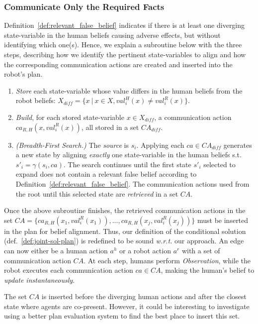 \subsubsection{Communicate Only the Required Facts}
Definition~\ref{def:relevant_false_belief} indicates if there is at least one diverging state-variable in the human beliefs causing adverse effects, but without identifying which one(s).
Hence, we explain a subroutine below with the three steps, describing how we identify the pertinent state-variables to align and how the corresponding communication actions are created and inserted into the robot's plan.

\begin{enumerate}
    \item 
    \textit{Store} each state-variable whose value differs in the human beliefs from the robot beliefs: $X_{diff} = \{ x ~|~ x\in X, val^H_i(x) \neq val^R_i(x) \}$.

    \item
    \textit{Build}, for each stored state-variable $x \in X_{diff}$, a communication action $ca_{R, H}(x,val^R_i(x))$, all stored in a set $\mathit{CA}_{diff}$.

    \item 
    \textit{(Breadth-First Search.)} 
    The \textit{source} is $s_i$. Applying each $ca \in \mathit{CA}_{diff}$ generates a new state by aligning \textit{exactly} one state-variable in the human beliefs s.t. $s'_i = \gamma(s_i, ca )$. 
    The search continues until the first state $s'_i$ selected to expand does not contain a relevant false belief according to Definition~\ref{def:relevant_false_belief}. The communication actions used from the root until this selected state are \textit{retrieved} in a set $\mathit{CA}$.
\end{enumerate}

Once the above subroutine finishes, the retrieved communication actions in the set $\mathit{CA} = \{ ca_{R, H}(x_1,val^R_i(x_1)),..., ca_{R, H}(x_j,val^R_i(x_j)) \}$ must be inserted in the plan for belief alignment. 
Thus, our definition of the conditional solution (def.~\ref{def:joint-sol-plan}) is redefined to be sound \textit{w.r.t.} our approach. An edge can now either be a human action $a^h$ or a robot action $a^r$ with a set of communication action $CA$.
At each step, humans perform \textit{Observation}, while the robot executes each communication action $ca \in \mathit{CA}$, making the human's belief to \textit{update instantaneously}.

The set $\mathit{CA}$ is inserted before the diverging human actions and after the closest state where agents are co-present. 
However, it could be interesting to investigate using a better plan evaluation system to find the best place to insert this set.

